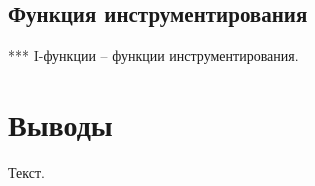 \subsection{Функция инструментирования}

***
I-функции -- функции инструментирования.

\section{Выводы}

Текст.
